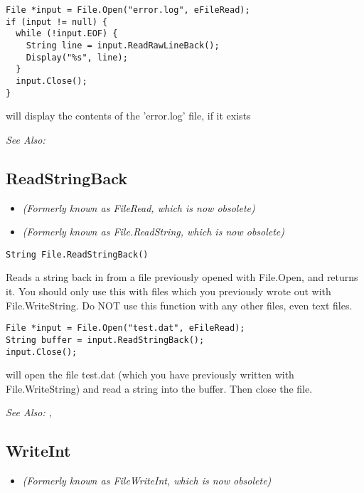 \begin{verbatim}
File *input = File.Open("error.log", eFileRead);
if (input != null) {
  while (!input.EOF) {
    String line = input.ReadRawLineBack();
    Display("%s", line);
  }
  input.Close();
}
\end{verbatim}
will display the contents of the 'error.log' file, if it exists

\it{See Also:} 


\subsection{ReadStringBack}\label{File.ReadStringBack}%

\begin{itemize}
\item \it{(Formerly known as FileRead, which is now obsolete)}
\item \it{(Formerly known as File.ReadString, which is now obsolete)}
\end{itemize}

\begin{verbatim}
String File.ReadStringBack()
\end{verbatim}
Reads a string back in from a file previously opened with File.Open, and returns it.
You should only use this with files which you previously wrote out with
File.WriteString. Do NOT use this function with any other files, even text files.

\begin{verbatim}
File *input = File.Open("test.dat", eFileRead);
String buffer = input.ReadStringBack();
input.Close();
\end{verbatim}
will open the file test.dat (which you have previously written with File.WriteString) and
read a string into the buffer. Then close the file.

\it{See Also:} , 


\subsection{WriteInt}\label{File.WriteInt}%

\begin{itemize}
\item \it{(Formerly known as FileWriteInt, which is now obsolete)}
\end{itemize}

